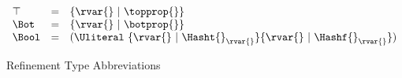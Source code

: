 \begin{figure*}
$$
\begin{array}{lclr}
  \top &=& {\refinenotype {\rvar{}} {\topprop{}}}\\
  \Bot &=& {\refinenotype {\rvar{}} {\botprop{}}}\\
  \Bool &=& \Unionsplice{\refinenotype{\rvar{}}{\isprop{\Hasht{}}{\rvar{}}}
    \refinenotype{\rvar{}}{\isprop{\Hashf{}}{\rvar{}}}}\\
\end{array}
$$
\caption{Refinement Type Abbreviations}
\end{figure*}
